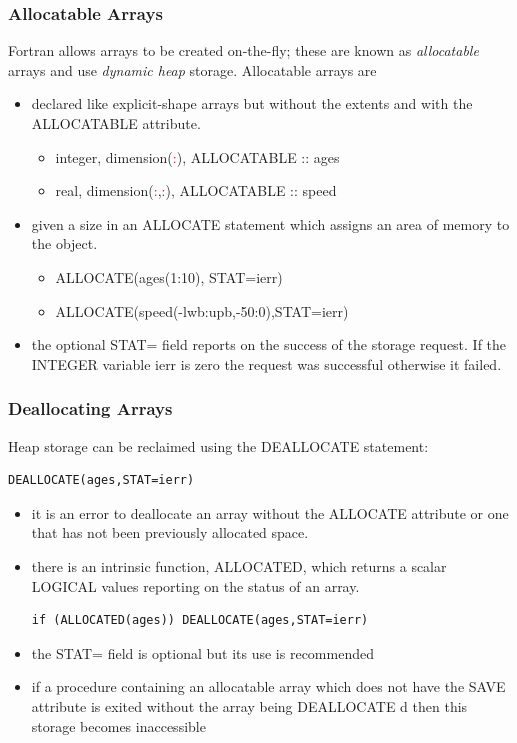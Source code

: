 \documentclass[11pt]{beamer}
\begin{document}
\begin{frame}[fragile]
\frametitle{Allocatable Arrays}

\footnotesize{
Fortran allows arrays to be created on-the-fly; these are known as \emph{allocatable} arrays and use \emph{dynamic heap} storage. Allocatable arrays are
\begin{itemize}
\item declared like explicit-shape arrays but without the extents and with the ALLOCATABLE attribute.
\begin{itemize}
\item integer, dimension(\textcolor{red}{:}), ALLOCATABLE :: ages
\item real, dimension(\textcolor{red}{:},\textcolor{red}{:}), ALLOCATABLE :: speed
 \end{itemize}
 \item given a size in an ALLOCATE statement which assigns an area of memory to the object.
\begin{itemize}
\item ALLOCATE(ages(1:10), STAT=ierr)
\item ALLOCATE(speed(-lwb:upb,-50:0),STAT=ierr)
 \end{itemize}
\item the optional STAT= field reports on the success of the storage request. If the INTEGER variable ierr is zero the request was successful otherwise it failed. 
 \end{itemize}
}

\end{frame}

\begin{frame}[fragile]
\frametitle{Deallocating Arrays}

\footnotesize{
Heap storage can be reclaimed using the DEALLOCATE statement:
 \begin{lstlisting}[style=Fortran]
DEALLOCATE(ages,STAT=ierr)
 \end{lstlisting}

\begin{itemize}
\item it is an error to deallocate an array without the ALLOCATE attribute or one that has not been previously allocated space.
\item there is an intrinsic function, ALLOCATED, which returns a scalar LOGICAL values reporting on the status of an array. \\
 \begin{lstlisting}[style=Fortran]
if (ALLOCATED(ages)) DEALLOCATE(ages,STAT=ierr)
 \end{lstlisting}

\item the STAT= field is optional but its use is recommended
\item if a procedure containing an allocatable array which does not have the SAVE attribute is exited without the array being DEALLOCATE d then this storage becomes inaccessible
 \end{itemize}
}

\end{frame}
\end{document}

